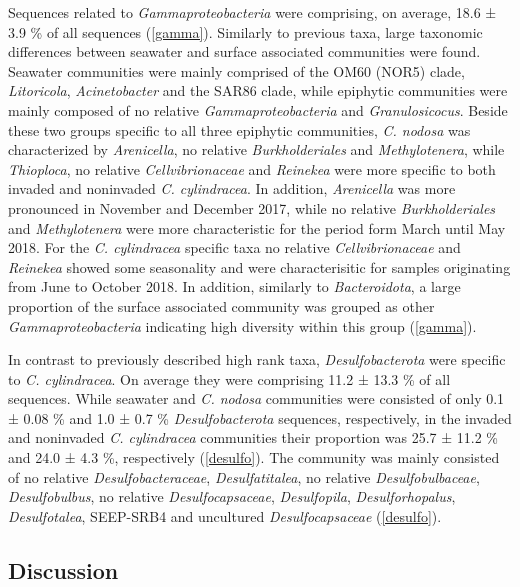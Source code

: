 \documentclass[12pt,]{article}
\begin{document}
Sequences related to \emph{Gammaproteobacteria} were comprising, on
average, 18.6 ± 3.9 \si{\percent} of all sequences (\autoref{gamma}).
Similarly to previous taxa, large taxonomic differences between seawater
and surface associated communities were found. Seawater communities were
mainly comprised of the OM60 (NOR5) clade, \emph{Litoricola},
\emph{Acinetobacter} and the SAR86 clade, while epiphytic communities
were mainly composed of no relative \emph{Gammaproteobacteria} and
\emph{Granulosicocus}. Beside these two groups specific to all three
epiphytic communities, \emph{C. nodosa} was characterized by
\emph{Arenicella}, no relative \emph{Burkholderiales} and
\emph{Methylotenera}, while \emph{Thioploca}, no relative
\emph{Cellvibrionaceae} and \emph{Reinekea} were more specific to both
invaded and noninvaded \emph{C. cylindracea}. In addition,
\emph{Arenicella} was more pronounced in November and December 2017,
while no relative \emph{Burkholderiales} and \emph{Methylotenera} were
more characteristic for the period form March until May 2018. For the
\emph{C. cylindracea} specific taxa no relative \emph{Cellvibrionaceae}
and \emph{Reinekea} showed some seasonality and were characterisitic for
samples originating from June to October 2018. In addition, similarly to
\emph{Bacteroidota}, a large proportion of the surface associated
community was grouped as other \emph{Gammaproteobacteria} indicating
high diversity within this group (\autoref{gamma}).

In contrast to previously described high rank taxa,
\emph{Desulfobacterota} were specific to \emph{C. cylindracea}. On
average they were comprising 11.2 ± 13.3 \si{\percent} of all sequences.
While seawater and \emph{C. nodosa} communities were consisted of only
0.1 ± 0.08 \si{\percent} and 1.0 ± 0.7 \si{\percent}
\emph{Desulfobacterota} sequences, respectively, in the invaded and
noninvaded \emph{C. cylindracea} communities their proportion was 25.7 ±
11.2 \si{\percent} and 24.0 ± 4.3 \si{\percent}, respectively
(\autoref{desulfo}). The community was mainly consisted of no relative
\emph{Desulfobacteraceae}, \emph{Desulfatitalea}, no relative
\emph{Desulfobulbaceae}, \emph{Desulfobulbus}, no relative
\emph{Desulfocapsaceae}, \emph{Desulfopila}, \emph{Desulforhopalus},
\emph{Desulfotalea}, SEEP-SRB4 and uncultured \emph{Desulfocapsaceae}
(\autoref{desulfo}).

\newpage

\hypertarget{discussion}{%
\subsection{Discussion}\label{discussion}}
\end{document}
